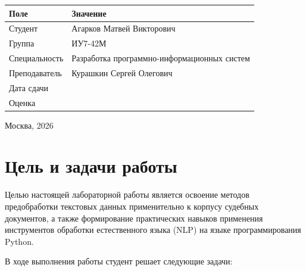 \documentclass[12pt, a4paper]{report}
\begin{document}
\begin{titlepage}
\begin{flushright}
  \begin{tabular}{p{5cm}p{7cm}}
    \toprule
    \rowcolor{LightBlue}
    \sffamily\small\bfseries Поле & \sffamily\small\bfseries Значение \\
    \midrule
    \sffamily\small Студент       & Агарков Матвей Викторович \underline{\hspace{6.5cm}} \\[4pt]
    \sffamily\small Группа        & ИУ7-42М \underline{\hspace{6.5cm}} \\[4pt]
    \sffamily\small Специальность & Разработка программно-информационных систем \\[4pt]
    \sffamily\small Преподаватель & Курашкин Сергей Олегович \underline{\hspace{6.5cm}} \\[4pt]
    \sffamily\small Дата сдачи    & \underline{\hspace{6.5cm}} \\[4pt]
    \sffamily\small Оценка        & \underline{\hspace{6.5cm}} \\
    \bottomrule
  \end{tabular}
\end{flushright}

\vfill
\begin{center}
  {\sffamily\normalsize Москва, 2026}
\end{center}
\end{titlepage}

\tableofcontents
\thispagestyle{plain}
\clearpage

\chapter{Цель и задачи работы}

Целью настоящей лабораторной работы является освоение методов предобработки
текстовых данных применительно к корпусу судебных документов, а также формирование
практических навыков применения инструментов обработки естественного языка (NLP)
на языке программирования Python.

В ходе выполнения работы студент решает следующие задачи:
\end{document}
